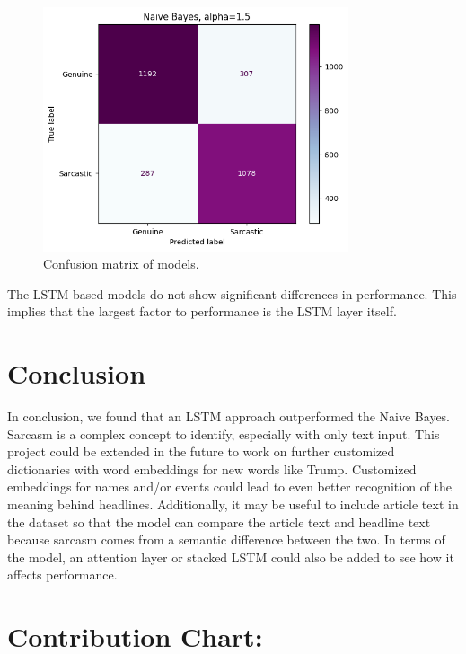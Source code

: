 \documentclass[11pt]{article}
\begin{document}
\begin{figure}[tbh]
    \centering
    \includegraphics[width=9cm]{nb-cm.png}
    \caption{Confusion matrix of models.}
    \label{fig:cm}
\end{figure}




The LSTM-based models do not show significant differences in performance.
This implies that the largest factor to performance is the LSTM layer itself.

\section{Conclusion}

In conclusion, we found that an LSTM approach outperformed the Naive Bayes.
Sarcasm is a complex concept to identify, especially with only text input.
This project could be extended in the future to work on further
customized dictionaries with word embeddings for new words like Trump.
Customized embeddings for names and/or events could lead to even better
recognition of the meaning behind headlines.
Additionally, it may be useful to include article text in the dataset
so that the model can compare the article text and headline text
because sarcasm comes from a semantic difference between the two.
In terms of the model, an attention layer or stacked LSTM
could also be added to see how it affects performance.

\section{Contribution Chart:}
\end{document}
